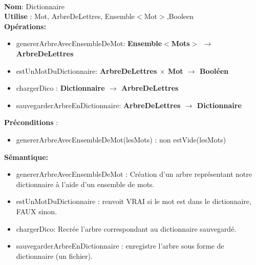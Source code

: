 \documentclass{article}
\begin{document}
    \noindent
    \\
    \textbf{Nom}: Dictionnaire\\
    \textbf{Utilise} : Mot, ArbreDeLettres, Ensemble$<$Mot$>$,Booleen\\
    \textbf{Opérations:} \begin{itemize}[label=$\ $, leftmargin=2cm, itemsep=0cm]
        \item genererArbreAvecEnsembleDeMot: \textbf{Ensemble$<$Mots$>$ $\rightarrow $ ArbreDeLettres}
        \item estUnMotDuDictionnaire: \textbf{ArbreDeLettres $\times$ Mot $\rightarrow $ Booléen}
        \item chargerDico : \textbf{Dictionnaire $ \rightarrow$ ArbreDeLettres}
        \item sauvegarderArbreEnDictionnaire: \textbf{ArbreDeLettres $\rightarrow$ Dictionnaire}
        
    \end{itemize}
    \textbf{Préconditions} :
    \begin{itemize}[label=$\ $, leftmargin=2cm, itemsep=0cm]
     \item genererArbreAvecEnsembleDeMot(lesMots) : non estVide(lesMots)
     \end{itemize}

    \textbf{Sémantique: }\begin{itemize}[label=$\- $, leftmargin=2cm, itemsep=0cm]
        \item genererArbreAvecEnsembleDeMot : Création d'un arbre représentant notre dictionnaire à l'aide d'un ensemble de mots.
        \item estUnMotDuDictionnaire : renvoit VRAI si le mot est dans le dictionnaire, FAUX sinon.
        \item chargerDico: Recrée l'arbre correspondant au dictionnaire sauvegardé.
        \item sauvegarderArbreEnDictionnaire : enregistre l'arbre sous forme de dictionnaire (un fichier).
    \end{itemize}
\end{document}
